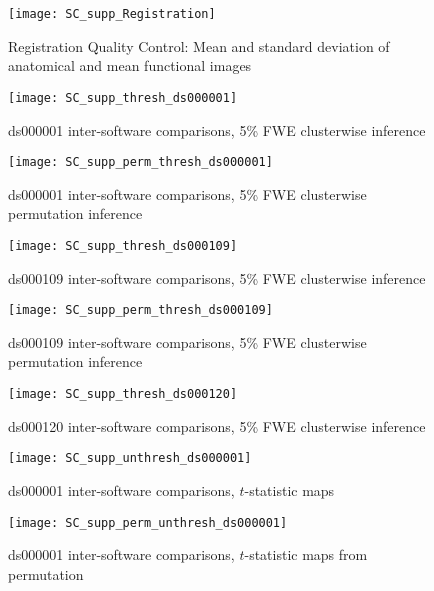 \begin{figure}[h!tbp]
\centering
	\texttt{[image: SC\_supp\_Registration]}	
\caption{Registration Quality Control: Mean and standard deviation of anatomical and mean functional images}
\label{fig:SC_supp_Registration}
\end{figure}

\begin{figure}[htbp]
\centering
	\texttt{[image: SC\_supp\_thresh\_ds000001]}	
\caption{ds000001 inter-software comparisons, 5\% FWE clusterwise inference}
\label{fig:SC_supp_thresh_ds000001}
\end{figure}

\begin{figure}[htbp]
\centering
	\texttt{[image: SC\_supp\_perm\_thresh\_ds000001]}	
\caption{ds000001 inter-software comparisons, 5\% FWE clusterwise permutation inference}
\label{fig:SC_supp_perm_thresh_ds000001}
\end{figure}

\begin{figure}[htbp]
\centering
	\texttt{[image: SC\_supp\_thresh\_ds000109]}	
\caption{ds000109 inter-software comparisons, 5\% FWE clusterwise inference}
\label{fig:SC_supp_thresh_ds000109}
\end{figure}

\begin{figure}[htbp]
\centering
	\texttt{[image: SC\_supp\_perm\_thresh\_ds000109]}	
\caption{ds000109 inter-software comparisons, 5\% FWE clusterwise permutation inference}
\label{fig:SC_supp_perm_thresh_ds000109}
\end{figure}

\begin{figure}[htbp]
\centering
	\texttt{[image: SC\_supp\_thresh\_ds000120]}	
\caption{ds000120 inter-software comparisons, 5\% FWE clusterwise inference}
\label{fig:SC_supp_thresh_ds000120}
\end{figure}

\begin{figure}[htbp]
\centering
	\texttt{[image: SC\_supp\_unthresh\_ds000001]}	
\caption{ds000001 inter-software comparisons, $t$-statistic maps}
\label{fig:SC_supp_unthresh_ds000001}
\end{figure}

\begin{figure}[htbp]
\centering
	\texttt{[image: SC\_supp\_perm\_unthresh\_ds000001]}	
\caption{ds000001 inter-software comparisons, $t$-statistic maps from permutation}
\label{fig:SC_supp_perm_unthresh_ds000001}
\end{figure}

